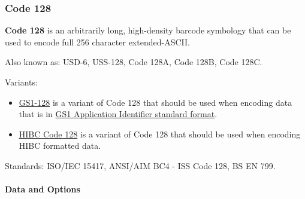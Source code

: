\hypertarget{code-128}{%
\subsubsection{Code 128}\label{code-128}}

\textbf{Code 128} is an arbitrarily long, high-density barcode symbology
that can be used to encode full 256 character extended-ASCII.

Also known as: USD-6, USS-128, Code 128A, Code 128B, Code 128C.

Variants:

\begin{itemize}
\tightlist
\item
  \protect\hyperlink{gs1-128}{GS1-128} is a variant of Code 128 that
  should be used when encoding data that is in
  \protect\hyperlink{gs1-application-identifier-standard-format}{GS1
  Application Identifier standard format}.
\item
  \protect\hyperlink{hibc-symbols}{HIBC Code 128} is a variant of Code
  128 that should be used when encoding HIBC formatted data.
\end{itemize}

Standards: ISO/IEC 15417, ANSI/AIM BC4 - ISS Code 128, BS EN 799.

\hypertarget{data-and-options-19}{%
\paragraph{Data and Options}\label{data-and-options-19}}

